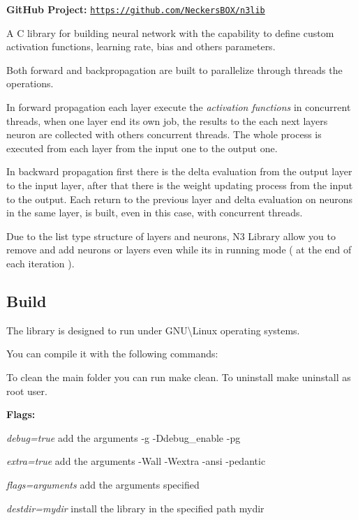 {\bfseries Git\+Hub Project\+:} \href{https://github.com/NeckersBOX/n3lib}{\tt https\+://github.\+com/\+Neckers\+B\+O\+X/n3lib}

A C library for building neural network with the capability to define custom activation functions, learning rate, bias and others parameters.

Both forward and backpropagation are built to parallelize through threads the operations.

In forward propagation each layer execute the {\itshape activation functions} in concurrent threads, when one layer end its own job, the results to the each next layer\textquotesingle{}s neuron are collected with others concurrent threads. The whole process is executed from each layer from the input one to the output one.

In backward propagation first there is the delta evaluation from the output layer to the input layer, after that there is the weight updating process from the input to the output. Each return to the previous layer and delta evaluation on neurons in the same layer, is built, even in this case, with concurrent threads.

Due to the list type structure of layers and neurons, N3 Library allow you to remove and add neurons or layers even while it\textquotesingle{}s in running mode ( at the end of each iteration ).

\subsection*{Build}

The library is designed to run under G\+NU\textbackslash{}Linux operating systems.

You can compile it with the following commands\+: 


To clean the main folder you can run {\ttfamily make clean}. To uninstall {\ttfamily make uninstall} as root user.

{\bfseries Flags\+:}
\begin{DoxyItemize}
\item {\itshape debug=true} add the arguments {\ttfamily -\/g -\/\+Ddebug\+\_\+enable -\/pg}
\item {\itshape extra=true} add the arguments {\ttfamily -\/\+Wall -\/\+Wextra -\/ansi -\/pedantic}
\item {\itshape flags=arguments} add the arguments specified
\item {\itshape destdir=mydir} install the library in the specified path {\ttfamily mydir}
\end{DoxyItemize}

